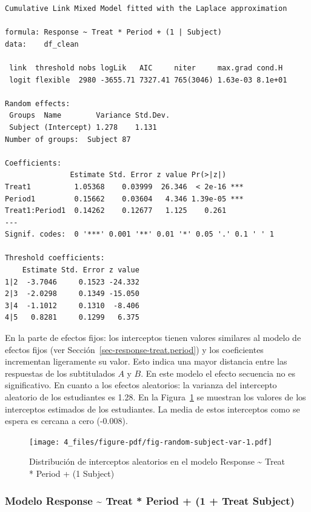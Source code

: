 \documentclass[
  12pt,
  a4paper,
  extrafontsizes,
  onecolumn,
  openright,
  table]{memoir}
\begin{document}
\begin{verbatim}
Cumulative Link Mixed Model fitted with the Laplace approximation

formula: Response ~ Treat * Period + (1 | Subject)
data:    df_clean

 link  threshold nobs logLik   AIC     niter     max.grad cond.H 
 logit flexible  2980 -3655.71 7327.41 765(3046) 1.63e-03 8.1e+01

Random effects:
 Groups  Name        Variance Std.Dev.
 Subject (Intercept) 1.278    1.131   
Number of groups:  Subject 87 

Coefficients:
               Estimate Std. Error z value Pr(>|z|)    
Treat1          1.05368    0.03999  26.346  < 2e-16 ***
Period1         0.15662    0.03604   4.346 1.39e-05 ***
Treat1:Period1  0.14262    0.12677   1.125    0.261    
---
Signif. codes:  0 '***' 0.001 '**' 0.01 '*' 0.05 '.' 0.1 ' ' 1

Threshold coefficients:
    Estimate Std. Error z value
1|2  -3.7046     0.1523 -24.332
2|3  -2.0298     0.1349 -15.050
3|4  -1.1012     0.1310  -8.406
4|5   0.8281     0.1299   6.375
\end{verbatim}

\normalsize

En la parte de efectos fijos: los interceptos tienen valores similares
al modelo de efectos fijos (ver Sección~\ref{sec-response-treat.period})
y los coeficientes incrementan ligeramente su valor. Esto indica una
mayor distancia entre las respuestas de los subtitulados \(A\) y \(B\).
En este modelo el efecto secuencia no es significativo. En cuanto a los
efectos aleatorios: la varianza del intercepto aleatorio de los
estudiantes es 1.28. En la Figura~\ref{fig-random-subject-var} se
muestran los valores de los interceptos estimados de los estudiantes. La
media de estos interceptos como se espera es cercana a cero (-0.008).

\begin{figure}[h]

{\centering \texttt{[image: 4\_files/figure-pdf/fig-random-subject-var-1.pdf]}

}

\caption{\label{fig-random-subject-var}Distribución de interceptos
aleatorios en el modelo Response \textasciitilde{} Treat * Period + (1
\textbar{} Subject)}

\end{figure}

\hypertarget{modelo-response-treat-period-1-treat-subject}{%
\subsubsection{Modelo Response \textasciitilde{} Treat * Period + (1 +
Treat \textbar{}
Subject)}\label{modelo-response-treat-period-1-treat-subject}}
\end{document}

